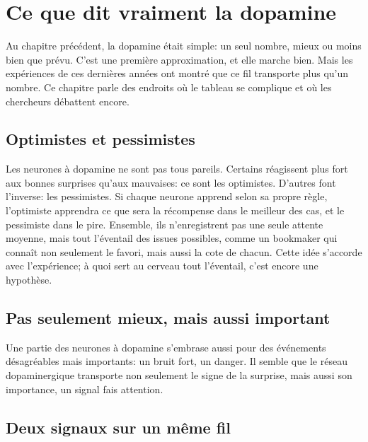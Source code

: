 \chapter{Ce que dit vraiment la dopamine}

Au chapitre précédent, la dopamine était simple: un seul nombre, \og mieux ou moins bien que prévu\fg{}. C'est une première approximation, et elle marche bien. Mais les expériences de ces dernières années ont montré que ce \og fil\fg{} transporte plus qu'un nombre. Ce chapitre parle des endroits où le tableau se complique et où les chercheurs débattent encore.

\section*{Optimistes et pessimistes}

Les neurones à dopamine ne sont pas tous pareils. Certains réagissent plus fort aux bonnes surprises qu'aux mauvaises: ce sont les optimistes. D'autres font l'inverse: les pessimistes. Si chaque neurone apprend selon sa propre règle, l'optimiste apprendra ce que sera la récompense dans le meilleur des cas, et le pessimiste dans le pire. Ensemble, ils n'enregistrent pas une seule attente moyenne, mais tout l'éventail des issues possibles, comme un bookmaker qui connaît non seulement le favori, mais aussi la cote de chacun. Cette idée s'accorde avec l'expérience; à quoi sert au cerveau tout l'éventail, c'est encore une hypothèse.


\section*{Pas seulement \og mieux\fg{}, mais aussi \og important\fg{}}

Une partie des neurones à dopamine s'embrase aussi pour des événements désagréables mais importants: un bruit fort, un danger. Il semble que le réseau dopaminergique transporte non seulement le signe de la surprise, mais aussi son importance, un signal \og fais attention\fg{}.

\section*{Deux signaux sur un même fil}

